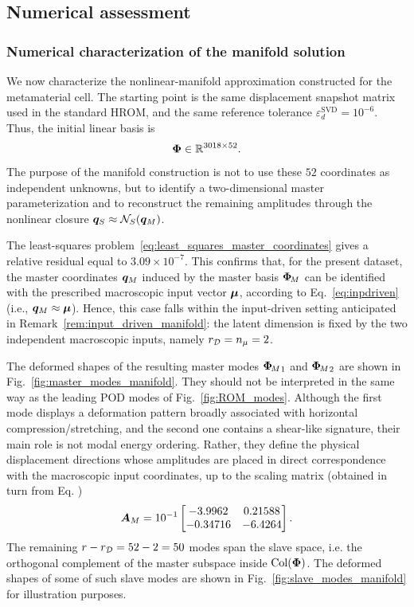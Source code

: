 \documentclass[11pt,a4paper]{article}
\newcommand{\PROMPT}[1]{ }
\begin{document}
\subsection{Numerical assessment}




\PROMPT{}

%
\subsubsection{Numerical characterization of the  manifold solution}
\label{subsec:num_char_fixed_manifold}

We now characterize the nonlinear-manifold approximation constructed for the
metamaterial cell. The starting point is the same displacement snapshot matrix
used in the standard HROM, and the same reference tolerance
$\varepsilon_d^{\mathrm{SVD}}=10^{-6}$. Thus, the initial linear basis is
\[
    \bm{\Phi}\in\mathbb{R}^{3018\times 52}.
\]
The purpose of the manifold construction is not to use these $52$ coordinates
as independent unknowns, but to identify a two-dimensional master
parameterization and to reconstruct the remaining amplitudes through the
nonlinear closure $\bm{q}_{S}\approx\mathcal{N}_{S}(\bm{q}_M)$.

The least-squares problem~\eqref{eq:least_squares_master_coordinates} gives a
relative residual equal to $3.09\times10^{-7}$. This confirms that, for the
present dataset, the master coordinates $\bm{q}_M$ induced by the master basis
$\bm{\Phi}_{\!M}$ can be identified with the prescribed macroscopic input vector
$\bm{\mu}$, according to Eq.~\eqref{eq:inpdriven} (i.e., $\bm{q}_M \approx \bm{\mu}$). Hence, this case falls within
the input-driven setting anticipated in Remark~\ref{rem:input_driven_manifold}:
the latent dimension is fixed by the two independent macroscopic inputs,
namely $r_{\mathcal{D}}=n_{\mu}=2$.

The deformed shapes of the resulting master modes ${\bm{\Phi}_{\!M}}_1$ and ${\bm{\Phi}_{\!M}}_2$ are shown in Fig.~\ref{fig:master_modes_manifold}.
They should not be interpreted in the same way as the leading POD modes of
Fig.~\ref{fig:ROM_modes}. Although the first mode displays a deformation
pattern broadly associated with horizontal compression/stretching, and the
second one contains a shear-like signature, their main role is not modal
energy ordering. Rather, they define the physical displacement directions whose
amplitudes are placed in direct correspondence with the macroscopic input
coordinates, up to the scaling matrix (obtained in turn from   Eq. )
\[
    \bm{A}_{M} =
    10^{-1}
    \begin{bmatrix}
    -3.9962 &  0.21588\\
    -0.34716 & -6.4264
    \end{bmatrix}.
\]
The remaining $r-r_{\mathcal{D}} = 52-2 = 50$ modes span the slave space, i.e. the
orthogonal complement of the master subspace inside $\operatorname{Col}(\bm{\Phi})$. The deformed shapes of some of such slave modes are
shown in Fig.~\ref{fig:slave_modes_manifold} for illustration purposes.
\end{document}
